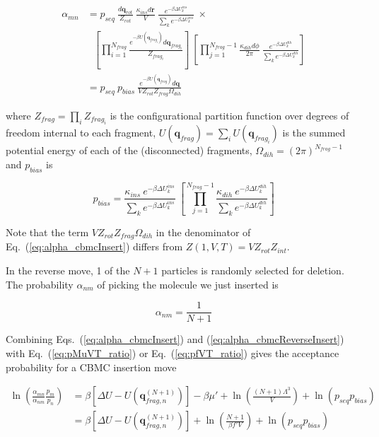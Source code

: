 \begin{align}
\alpha_{mn} &= p_{seq}\ \frac{d\mathbf{q}_{rot}}{Z_{rot}}\ \frac{\kappa_{ins}d\mathbf{r}}{V}\ \frac{e^{-\beta \Delta U_k^{ins}}}{\sum_k{e^{-\beta \Delta U_k^{ins}}}}\ \times \nonumber \\
&\ \ \ \left[\prod_{i=1}^{N_{frag}}{\frac{e^{-\beta U(\mathbf{q}_{frag_i})}d\mathbf{q}_{frag_i}}{Z_{frag_i}}}\right]\ \left[\prod_{j=1}^{N_{frag}-1}{\frac{\kappa_{dih}d\phi}{2\pi}\ \frac{e^{-\beta \Delta U_k^{dih}}}{\sum_k{e^{-\beta \Delta U_k^{dih}}}}}\right] \\
\label{eq:alpha_cbmcInsert}
&= p_{seq}\ p_{bias}\ \frac{e^{-\beta U(\mathbf{q}_{frag})}d\mathbf{q}}{VZ_{rot}Z_{frag}\Omega_{dih}}
\end{align}

where $Z_{frag} = \prod_i Z_{frag_i}$ is the configurational partition function over degrees of freedom internal to each fragment, $U(\mathbf{q}_{frag}) = \sum_iU(\mathbf{q}_{frag_i})$ is the summed potential energy of each of the (disconnected) fragments, $\Omega_{dih} = (2\pi)^{N_{frag}-1}$ and $p_{bias}$ is

\begin{equation}
p_{bias} = \frac{\kappa_{ins}\ e^{-\beta \Delta U_k^{ins}}}{\sum_k{e^{-\beta \Delta U_k^{ins}}}}\ \left[\prod_{j=1}^{N_{frag}-1}{\frac{\kappa_{dih}\ e^{-\beta \Delta U_k^{dih}}}{\sum_k{e^{-\beta \Delta U_k^{dih}}}}}\right]
\end{equation}

Note that the term $VZ_{rot}Z_{frag}\Omega_{dih}$ in the denominator of Eq.\ (\ref{eq:alpha_cbmcInsert}) differs from $Z(1,V,T)=VZ_{rot}Z_{int}$.

In the reverse move, 1 of the $N+1$ particles is randomly selected for deletion. The probability $\alpha_{nm}$ of picking the molecule we just inserted is

\begin{equation}
\label{eq:alpha_cbmcReverseInsert}
\alpha_{nm} = \frac{1}{N+1}
\end{equation}

Combining Eqs.\ (\ref{eq:alpha_cbmcInsert}) and (\ref{eq:alpha_cbmcReverseInsert}) with Eq.\ (\ref{eq:pMuVT_ratio}) or Eq.\ (\ref{eq:pfVT_ratio}) gives the acceptance probability for a CBMC insertion move

\begin{align}
\label{eq:pAcc_cbmcInsertMuShift}
\ln\left( \frac{\alpha_{mn}}{\alpha_{nm}} \frac{p_m}{p_n} \right) &= \beta \left[\Delta U - U(\mathbf{q}^{(N+1)}_{frag,n})\right] - \beta \mu' + \ln\left( \frac{(N+1)\Lambda^3}{V} \right) + \ln\left( p_{seq}p_{bias} \right) \\
\label{eq:pAcc_cbmcInsertFShift}
&= \beta \left[\Delta U - U(\mathbf{q}^{(N+1)}_{frag,n})\right] + \ln\left( \frac{N+1}{\beta f' V} \right) + \ln\left( p_{seq}p_{bias} \right)
\end{align}

